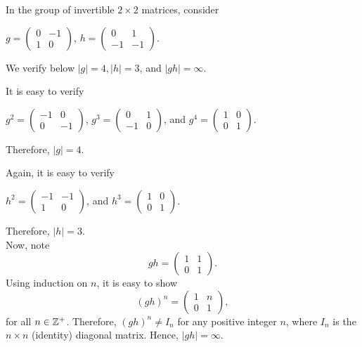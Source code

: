 \begin{xca}
In the group of invertible $2 \times 2$ matrices, consider
\begin{center}
    $g =
    \left( \begin{array}{cc}
        0 & -1 \\
        1 & 0 \end{array} \right)$,
    $h =
    \left( \begin{array}{cc}
        0  & 1 \\
        -1 & -1 \end{array} \right)$.
\end{center}
We verify below $|g| = 4, |h| = 3$, and $|gh| = \infty$.

It is easy to verify
\begin{center}
    $g^2 = \left( \begin{array}{cc}
               -1 & 0 \\
                0 & -1 \end{array} \right)$,
    $g^3 = \left( \begin{array}{cc}
        0 & 1 \\
        -1 & 0 \end{array} \right)$, and
    $g^4 = \left( \begin{array}{cc}
        1 & 0 \\
        0 & 1 \end{array} \right)$.
\end{center}
Therefore, $|g| = 4$.

Again, it is easy to verify
\begin{center}
    $h^2 = \left( \begin{array}{cc}
               -1 & -1 \\
                1 & 0 \end{array} \right)$, and
    $h^3 = \left( \begin{array}{cc}
               1 & 0 \\
               0 & 1 \end{array} \right)$.
\end{center}
Therefore, $|h| = 3$. \\

Now, note
\[
gh = \left( \begin{array}{cc}
          1 & 1 \\
          0 & 1 \end{array} \right).
\]
Using induction on $n$, it is easy to show
\[
(gh)^n = \left( \begin{array}{cc}
             1 & n \\
             0 & 1 \end{array} \right),
\]
for all $n \in \mathbb{Z}^+$. Therefore, $(gh)^n \neq I_n$ for any positive integer
$n$, where $I_n$ is the $n \times n$ (identity) diagonal matrix. Hence, $|gh| =
\infty$.
\end{xca}

